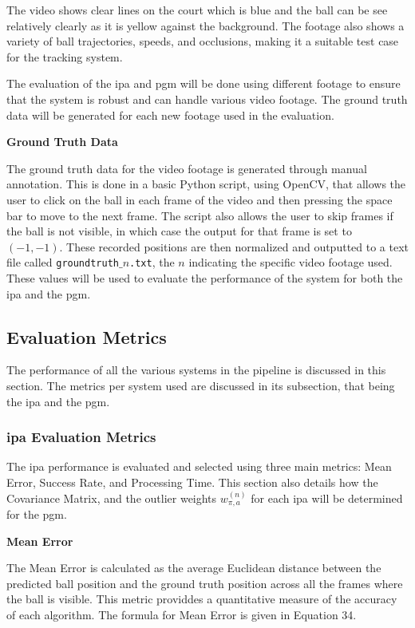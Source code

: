 \documentclass[12pt,a4paper]{article}
\begin{document}
The video shows clear lines on the court which is blue and the ball can be see relatively clearly as it is yellow against the background. The footage also shows a variety of ball trajectories, speeds, and occlusions, making it a suitable test case for the tracking system.

The evaluation of the \acs{ipa} and \acs{pgm} will be done using different footage to ensure that the system is robust and can handle various video footage. The ground truth data will be generated for each new footage used in the evaluation.

\textbf{Ground Truth Data}

The ground truth data for the video footage is generated through manual annotation. This is done in a basic Python script, using OpenCV, that allows the user to click on the ball in each frame of the video and then pressing the space bar to move to the next frame. The script also allows the user to skip frames if the ball is not visible, in which case the output for that frame is set to $(-1,-1)$. These recorded positions are then normalized and outputted to a text file called \texttt{groundtruth$\_n$.txt}, the $n$ indicating the specific video footage used. These values will be used to evaluate the performance of the system for both the \acs{ipa} and the \acs{pgm}.

\subsection{Evaluation Metrics}
The performance of all the various systems in the pipeline is discussed in this section. The metrics per system used are discussed in its subsection, that being the \acs{ipa} and the \acs{pgm}.

\subsubsection{\acs{ipa} Evaluation Metrics}
The \acs{ipa} performance is evaluated and selected using three main metrics: Mean Error, Success Rate, and Processing Time. This section also details how the Covariance Matrix, and the outlier weights $w_{\pi,a}^{(n)}$ for each \acs{ipa} will be determined for the \acs{pgm}.

\textbf{Mean Error}

The Mean Error is calculated as the average Euclidean distance between the predicted ball position and the ground truth position across all the frames where the ball is visible. This metric providdes a quantitative measure of the accuracy of each algorithm. The formula for Mean Error is given in Equation 34.
\end{document}
